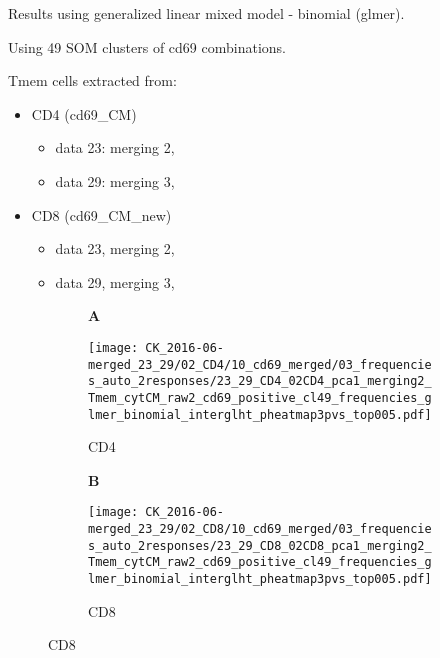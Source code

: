 \documentclass[a4paper, 12pt]{article}
\begin{document}
\pagestyle{empty}



Results using generalized linear mixed model - binomial (glmer).

Using 49 SOM clusters of cd69 combinations. 


Tmem cells extracted from:
\begin{itemize}
  \item  CD4 (cd69\_CM)
      \begin{itemize}
      \item data 23: merging 2, 
      \item data 29: merging 3,
    \end{itemize}

  \item  CD8 (cd69\_CM\_new)
  \begin{itemize}
  \item data 23, merging 2,
  \item data 29, merging 3, 
\end{itemize}
  
\end{itemize}


\begin{figure}[!thb]
\centering

    \begin{subfigure}[t]{0.02\textwidth}
    \vskip 0pt
        \textbf{\textsf{\normalsize A}}
    \end{subfigure}
    \begin{subfigure}[t]{0.45\textwidth}
    \vskip 0pt
    \caption{CD4}
        \texttt{[image: CK\_2016-06-merged\_23\_29/02\_CD4/10\_cd69\_merged/03\_frequencies\_auto\_2responses/23\_29\_CD4\_02CD4\_pca1\_merging2\_Tmem\_cytCM\_raw2\_cd69\_positive\_cl49\_frequencies\_glmer\_binomial\_interglht\_pheatmap3pvs\_top005.pdf]}
    \end{subfigure}
\quad
    \begin{subfigure}[t]{0.02\textwidth}
    \vskip 0pt
        \textbf{\textsf{\normalsize B}}
    \end{subfigure}
    \begin{subfigure}[t]{0.45\textwidth}
    \vskip 0pt
    \caption{CD8}
        \texttt{[image: CK\_2016-06-merged\_23\_29/02\_CD8/10\_cd69\_merged/03\_frequencies\_auto\_2responses/23\_29\_CD8\_02CD8\_pca1\_merging2\_Tmem\_cytCM\_raw2\_cd69\_positive\_cl49\_frequencies\_glmer\_binomial\_interglht\_pheatmap3pvs\_top005.pdf]}
    \end{subfigure}
    
    
\end{figure}
\end{document}
